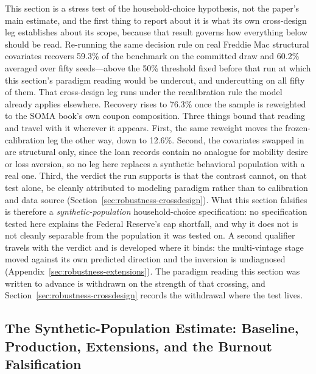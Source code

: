 \documentclass[12pt]{article}
\begin{document}
This section is a stress test of the household-choice hypothesis, not the paper's main estimate, and the first thing to report about it is what its own cross-design leg establishes about its scope, because that result governs how everything below should be read. Re-running the same decision rule on real Freddie Mac structural covariates recovers 59.3\% of the benchmark on the committed draw and 60.2\% averaged over fifty seeds---above the 50\% threshold fixed before that run at which this section's paradigm reading would be undercut, and undercutting on all fifty of them. That cross-design leg runs under the recalibration rule the model already applies elsewhere. Recovery rises to 76.3\% once the sample is reweighted to the SOMA book's own coupon composition. Three things bound that reading and travel with it wherever it appears. First, the same reweight moves the frozen-calibration leg the other way, down to 12.6\%. Second, the covariates swapped in are structural only, since the loan records contain no analogue for mobility desire or loss aversion, so no leg here replaces a synthetic behavioral population with a real one. Third, the verdict the run supports is that the contrast cannot, on that test alone, be cleanly attributed to modeling paradigm rather than to calibration and data source (Section~\ref{sec:robustness-crossdesign}). What this section falsifies is therefore a \emph{synthetic-population} household-choice specification: no specification tested here explains the Federal Reserve's cap shortfall, and why it does not is not cleanly separable from the population it was tested on. A second qualifier travels with the verdict and is developed where it binds: the multi-vintage stage moved against its own predicted direction and the inversion is undiagnosed (Appendix~\ref{sec:robustness-extensions}). The paradigm reading this section was written to advance is withdrawn on the strength of that crossing, and Section~\ref{sec:robustness-crossdesign} records the withdrawal where the test lives.

\subsection{The Synthetic-Population Estimate: Baseline, Production, Extensions, and the Burnout Falsification}\label{sec:abm-results}
\end{document}
